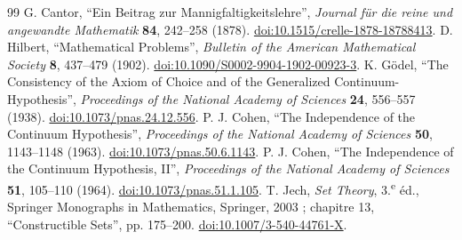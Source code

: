 \begin{thebibliography}{99}
 G. Cantor, ``Ein Beitrag zur Mannigfaltigkeitslehre'',
\emph{Journal für die reine und angewandte Mathematik} \textbf{84},
242--258 (1878). \href{https://doi.org/10.1515/crelle-1878-18788413}{doi:10.1515/crelle-1878-18788413}.
 D. Hilbert, ``Mathematical Problems'',
\emph{Bulletin of the American Mathematical Society} \textbf{8},
437--479 (1902). \href{https://doi.org/10.1090/S0002-9904-1902-00923-3}{doi:10.1090/S0002-9904-1902-00923-3}.
 K. Gödel, ``The Consistency of the Axiom of Choice and
of the Generalized Continuum-Hypothesis'', \emph{Proceedings of the National
Academy of Sciences} \textbf{24}, 556--557 (1938).
\href{https://doi.org/10.1073/pnas.24.12.556}{doi:10.1073/pnas.24.12.556}.
 P. J. Cohen, ``The Independence of the Continuum
Hypothesis'', \emph{Proceedings of the National Academy of Sciences}
\textbf{50}, 1143--1148 (1963).
\href{https://doi.org/10.1073/pnas.50.6.1143}{doi:10.1073/pnas.50.6.1143}.
 P. J. Cohen, ``The Independence of the Continuum
Hypothesis, II'', \emph{Proceedings of the National Academy of Sciences}
\textbf{51}, 105--110 (1964).
\href{https://doi.org/10.1073/pnas.51.1.105}{doi:10.1073/pnas.51.1.105}.
\enlargethispage{3\baselineskip}
 T. Jech, \emph{Set Theory}, 3.\textsuperscript{e} éd.,
Springer Monographs in Mathematics, Springer, 2003 ; chapitre 13,
``Constructible Sets'', pp. 175--200.
\href{https://doi.org/10.1007/3-540-44761-X}{doi:10.1007/3-540-44761-X}.
\end{thebibliography}
